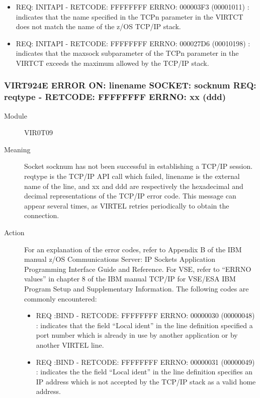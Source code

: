 \documentclass[letterpaper,10pt,english]{sphinxmanual}
\begin{document}
\begin{description}
\begin{itemize}
\item {} 
REQ: INITAPI - RETCODE: FFFFFFFF ERRNO: 000003F3 (00001011) : indicates that the name specified in the TCPn parameter in the VIRTCT does not match the name of the z/OS TCP/IP stack.

\item {} 
REQ: INITAPI - RETCODE: FFFFFFFF ERRNO: 000027D6 (00010198) : indicates that the maxsock subparameter of the TCPn parameter in the VIRTCT exceeds the maximum allowed by the TCP/IP stack.

\end{itemize}

\end{description}


\subsubsection{VIRT924E ERROR ON: linename SOCKET: socknum REQ: reqtype - RETCODE: FFFFFFFF ERRNO: xx (ddd)}
\label{\detokenize{messages:virt924e-error-on-linename-socket-socknum-req-reqtype-retcode-ffffffff-errno-xx-ddd}}\begin{description}
\item[{Module}] \leavevmode
VIR0T09

\item[{Meaning}] \leavevmode
Socket socknum has not been successful in establishing a TCP/IP  session. reqtype is the TCP/IP  API call which  failed, linename is the external name of the line, and xx and ddd are respectively the hexadecimal and decimal representations of the TCP/IP error code. This message can appear several times, as VIRTEL retries periodically to obtain the connection.

\item[{Action}] \leavevmode
For an explanation of the error codes, refer to Appendix B of the IBM manual z/OS Communications Server: IP Sockets Application Programming Interface Guide and Reference. For VSE, refer to “ERRNO values” in chapter 8 of the IBM manual TCP/IP for VSE/ESA IBM Program Setup and Supplementary Information.
The following codes are commonly encountered:
\begin{itemize}
\item {} 
REQ :BIND - RETCODE: FFFFFFFF ERRNO: 00000030 (00000048) : indicates that the field “Local ident” in the line definition specified a port number which is already in use by another application or by another VIRTEL line.

\item {} 
REQ :BIND - RETCODE: FFFFFFFF ERRNO: 00000031 (00000049) : indicates the the field “Local ident” in the line definition specifies an IP address which is not accepted by the TCP/IP stack as a valid home address.

\end{itemize}

\end{description}
\end{document}
